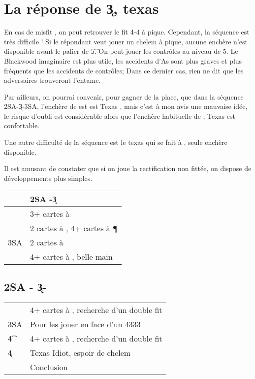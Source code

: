 \documentclass[a4paper,12pt]{article}
\begin{document}
\section*{La réponse de \k3, texas \C}

En cas de misfit \C, on peut retrouver le fit 4-4 à pique. Cependant, la séquence est très difficile !
Si le répondant veut jouer un chelem à pique, aucune enchère n'est disponible avant le palier de \t5.
On peut jouer les contrôles au niveau de 5. Le Blackwood imaginaire est plus utile, les accidents d'As sont plus graves et plus fréquents que les accidents de contrôles; Dans ce dernier cas, rien ne dit que les adversaires trouveront l'entame.

Par ailleurs, on pourrai convenir, pour gagner de la place, que dans la séquence 2SA-\k3-3SA, l'enchère de  est est Texas \T, mais c'est à mon avis une mauvaise idée, le risque d'oubli est considérable alors que l'enchère habituelle de , Texas \T est confortable.

Une autre difficulté de la séquence est le texas \T qui se fait à , seule enchère disponible.

Il est amusant de constater que si on joue la rectification non fittée, on dispose de développements plus simples.

\vspace{5pt}
\begin{tabular}{|l|l|}
\hline
& 2SA -\k3 \\
\hline
 \co3 & 3+ cartes à \C\\
 \p3  & 2 cartes à \C, 4+ cartes à \P\\
 3SA & 2 cartes à \C\\
 \co4 & 4+ cartes à \C, belle main\\
 \hline
\end{tabular}

 \subsection*{2SA - \k3- }  

   \begin{tabular}{ll}
   \p3 & 4+ cartes à \T, recherche d'un double fit \\
    3SA & Pour les jouer en face d'un 4333\\
    \t4 & 4+ cartes à \K, recherche d'un double fit \\
    \k4 & Texas Idiot, espoir de chelem\\
    \co4 & Conclusion \\
   \end{tabular}
\end{document}
